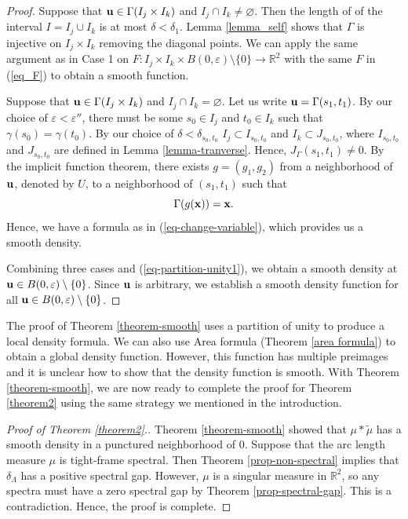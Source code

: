 \documentclass[12pt,a4paper,oneside]{amsart}
\theoremstyle{definition}
\newcommand{\RR}{{\mathbb R}}
\newcommand{\wt}[1]{\widetilde{#1}}
\newcounter{rem}
\begin{document}
\begin{proof}
 Suppose that ${\bf u}\in \Gamma(I_j\times I_k)$ and $I_j\cap I_k\ne\varnothing$. Then the length of of the interval $I= I_j\cup I_k$ is at most $\delta<\delta_1$. Lemma \ref{lemma_self} shows that $\Gamma$ is injective on $I_j\times I_k$ removing the diagonal points. We can apply the same argument as in Case 1 on $F: I_j\times I_k\times B(0,\varepsilon)\setminus \{0\} \to \RR^2 $ with the same $F$ in (\ref{eq_F}) to obtain a smooth function. 

 Suppose that ${\bf u}\in \Gamma(I_j\times I_k)$ and $I_j\cap I_k=\varnothing$. Let us write ${\bf u}  = \Gamma (s_1,t_1)$.   By our choice of $\varepsilon<\varepsilon''$, there must be some $s_0\in I_j$ and $t_0\in I_k$ such that $\gamma(s_0) = \gamma(t_0).$ By our choice of $\delta<\delta_{s_0,t_0}$ $I_j\subset I_{s_0,t_0}$ and $I_k\subset J_{s_0,t_0}$, where $I_{s_0,t_0}$ and $J_{s_0,t_0}$ are defined in Lemma \ref{lemma-tranverse}. Hence, $J_{\Gamma}(s_1,t_1)\ne 0$.  By the implicit function theorem, there exists $g = (g_1,g_2)$ from a neighborhood of ${\bf u}$, denoted by $U$, to a neighborhood of $(s_1,t_1)$ such that 
$$
\Gamma (g({\bf x})) = {\bf x}.
$$
Hence, we have a formula as in (\ref{eq-change-variable}), which provides us a smooth density. 

Combining three cases and (\ref{eq-partition-unity1}), we obtain a smooth density at ${\bf u}\in B(0,\varepsilon)\setminus\{0\}$. Since ${\bf u}$ is arbitrary, we establish a smooth density function for all ${\bf u}\in B(0,\varepsilon)\setminus \{0\}$.
\end{proof}

The proof of Theorem \ref{theorem-smooth} uses a partition of unity to produce a local density formula. We can also use Area formula (Theorem \ref{area formula}) to obtain a global density function. However, this function has multiple preimages and it is unclear {how} to show that the density function is smooth.  With Theorem \ref{theorem-smooth}, we are now ready to complete the proof for Theorem \ref{theorem2} using the same strategy we mentioned in the introduction. 


\medskip



\begin{proof}[Proof of Theorem \ref{theorem2}.] Theorem \ref{theorem-smooth} showed that $\mu\ast\wt\mu$ has a smooth density in a punctured neighborhood of $0$. Suppose that the arc length measure $\mu$ is tight-frame spectral. Then Theorem \ref{prop-non-spectral} implies that $\delta_{\Lambda}$ has a positive spectral gap. However, $\mu$ is a singular measure in $\RR^2$, so any spectra must have a zero spectral gap by Theorem \ref{prop-spectral-gap}. This is a contradiction. Hence, the proof is complete. 
\end{proof}
\end{document}
